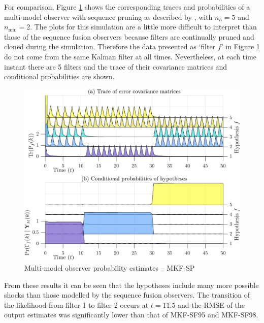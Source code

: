 For comparison, Figure \ref{fig:rod-obs-sim-test-probs-SP} shows the corresponding traces and probabilities of a multi-model observer with sequence pruning as described by \cite{eriksson_classification_1996}, with $n_h=5$ and $n_{\text{min}}=2$. The plots for this simulation are a little more difficult to interpret than those of the sequence fusion observers because filters are continually pruned and cloned during the simulation. Therefore the data presented as `filter $f$' in Figure \ref{fig:rod-obs-sim-test-probs-SP} do not come from the same Kalman filter at all times. Nevertheless, at each time instant there are 5 filters and the trace of their covariance matrices and conditional probabilities are shown.
\begin{figure}[htp]
	\centering
	\includegraphics[width=14cm]{images/rod_MKF_test_sim_MKF_SP_prob.png}
	\caption{Multi-model observer probability estimates – MKF-SP}
	\label{fig:rod-obs-sim-test-probs-SP}
\end{figure}
From these results it can be seen that the hypotheses include many more possible shocks than those modelled by the sequence fusion observers. The transition of the likelihood from filter 1 to filter 2 occurs at $t=11.5$ and the RMSE of the output estimates was significantly lower than that of MKF-SF95 and MKF-SF98.

